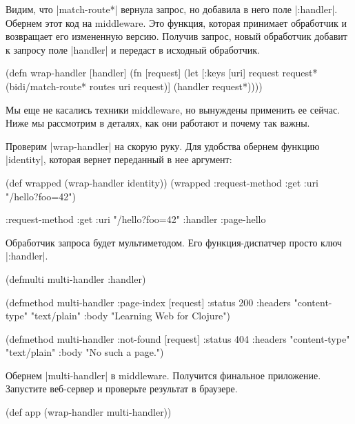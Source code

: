 Видим, что \spverb|match-route*| вернула запрос, но добавила в него поле
\spverb|:handler|. Обернем этот код на middleware. Это функция, которая
принимает обработчик и возвращает его измененную версию. Получив запрос, новый
обработчик добавит к запросу поле \spverb|handler| и передаст в исходный
обработчик.

\begin{english}
  \begin{clojure}
(defn wrap-handler [handler]
  (fn [request]
    (let [{:keys [uri]} request
          request* (bidi/match-route* routes uri request)]
      (handler request*))))
  \end{clojure}
\end{english}

Мы еще не касались техники middleware, но вынуждены применить ее сейчас. Ниже мы
рассмотрим в деталях, как они работают и почему так важны.

Проверим \spverb|wrap-handler| на скорую руку. Для удобства обернем функцию
\spverb|identity|, которая вернет переданный в нее аргумент:

\begin{english}
  \begin{clojure}
(def wrapped (wrap-handler identity))
(wrapped {:request-method :get
          :uri "/hello?foo=42"})

{:request-method :get
 :uri "/hello?foo=42"
 :handler :page-hello}
  \end{clojure}
\end{english}

Обработчик запроса будет мультиметодом. Его функция-диспатчер просто ключ
\spverb|:handler|.

\begin{english}
  \begin{clojure}
(defmulti multi-handler :handler)

(defmethod multi-handler :page-index
  [request]
  {:status 200
   :headers {"content-type" "text/plain"}
   :body "Learning Web for Clojure"})

(defmethod multi-handler :not-found
  [request]
  {:status 404
   :headers {"content-type" "text/plain"}
   :body "No such a page."})
  \end{clojure}
\end{english}

Обернем \spverb|multi-handler| в middleware. Получится финальное
приложение. Запустите веб-сервер и проверьте результат в браузере.

\begin{english}
  \begin{clojure}
(def app (wrap-handler multi-handler))
  \end{clojure}
\end{english}

